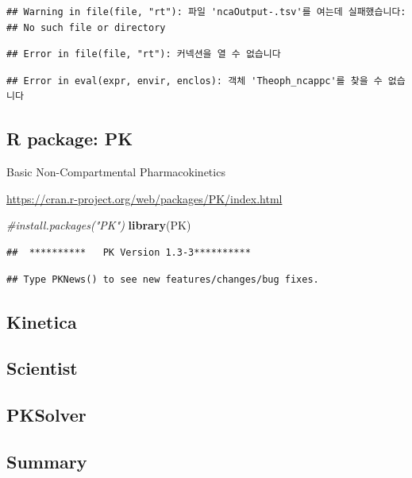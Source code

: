 \documentclass[]{krantz}
\makeatletter
\newenvironment{Shaded}{\begin{snugshade}}{\end{snugshade}}
\newcommand{\KeywordTok}[1]{\textcolor[rgb]{0.13,0.29,0.53}{\textbf{#1}}}
\newcommand{\CommentTok}[1]{\textcolor[rgb]{0.56,0.35,0.01}{\textit{#1}}}
\newcommand{\NormalTok}[1]{#1}
\newenvironment{kframe}{%
\medskip{}
\setlength{\fboxsep}{.8em}
 \def\at@end@of@kframe{}%
 \ifinner\ifhmode%
  \def\at@end@of@kframe{\end{minipage}}%
  \begin{minipage}{\columnwidth}%
 \fi\fi%
 \def\FrameCommand##1{\hskip\@totalleftmargin \hskip-\fboxsep
 \colorbox{shadecolor}{##1}\hskip-\fboxsep
     \hskip-\linewidth \hskip-\@totalleftmargin \hskip\columnwidth}%
 \MakeFramed {\advance\hsize-\width
   \@totalleftmargin\z@ \linewidth\hsize
   \@setminipage}}%
 {\par\unskip\endMakeFramed%
 \at@end@of@kframe}
\renewenvironment{Shaded}{\begin{kframe}}{\end{kframe}}
\theoremstyle{definition}
\theoremstyle{definition}
\theoremstyle{definition}
\theoremstyle{remark}
\makeatother
\begin{document}
\begin{verbatim}
## Warning in file(file, "rt"): 파일 'ncaOutput-.tsv'를 여는데 실패했습니다:
## No such file or directory
\end{verbatim}

\begin{verbatim}
## Error in file(file, "rt"): 커넥션을 열 수 없습니다
\end{verbatim}

\begin{verbatim}
## Error in eval(expr, envir, enclos): 객체 'Theoph_ncappc'를 찾을 수 없습니다
\end{verbatim}

\subsection{R package: PK}\label{r-package-pk}

Basic Non-Compartmental Pharmacokinetics

\url{https://cran.r-project.org/web/packages/PK/index.html}

\begin{Shaded}
\begin{Highlighting}[]
\CommentTok{#install.packages("PK")}
\KeywordTok{library}\NormalTok{(PK)}
\end{Highlighting}
\end{Shaded}

\begin{verbatim}
##  **********   PK Version 1.3-3**********
\end{verbatim}

\begin{verbatim}
## Type PKNews() to see new features/changes/bug fixes.
\end{verbatim}

\subsection{Kinetica}\label{kinetica}

\subsection{Scientist}\label{scientist}

\subsection{PKSolver}\label{pksolver}

\subsection{Summary}\label{summary}
\end{document}
